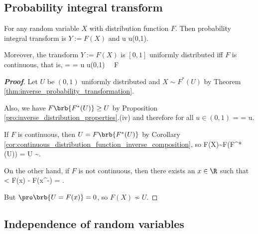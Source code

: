 \subsection{Probability integral transform}

\begin{theorem}\label{thm:probability_integral_transform}
For any random variable $X$ with distribution function $F$. Then probability integral transform is $Y:=F(X)$ and
\be
\pro{} \leq u \quad\forall u\in (0,1).
\ee

Moreover, the transform $Y:=F(X)$ is $[0,1]$ uniformly distributed iff $F$ is continuous, that is,
\be
\pro{} = \pro{} = u \quad\forall u\in (0,1) \ \lra\ F
\ee%
\end{theorem}

\begin{proof}[\bf Proof]
Let $U$ be $(0,1)$ uniformly distributed and $X\sim F^*(U)$ by Theorem \ref{thm:inverse_probability_transformation}.


Also, we have $F\brb{F^*(U)}\geq U$ by Proposition \ref{pro:inverse_distribution_properties}.(iv) and therefore for all $u\in (0,1)$
\be
\pro{} = \pro{} \leq \pro{}  = u.
\ee

If $F$ is continuous, then $U = F\brb{F^*(U)}$ by Corollary \ref{cor:continuous_distribution_function_inverse_composition}, so
\be
F(X)\sim F(F^*(U)) = U \sim {}.
\ee

On the other hand, if $F$ is not continuous, then there exists an $x\in \R$ such that
< F(x) - F(x^-) = \pro{} \leq \pro{}.
\ee

But $\pro\brb{U = F(x)} = 0$, so $F(X) \nsim U$.
\end{proof}

\subsection{Independence of random variables}


